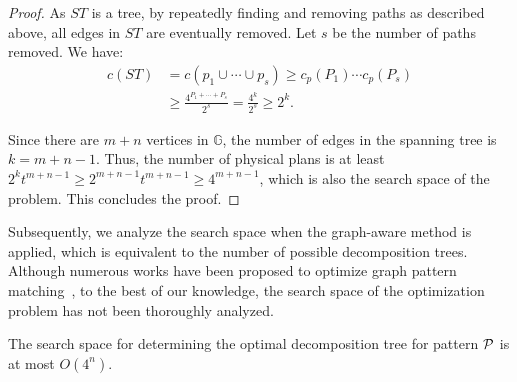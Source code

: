 \begin{proof}
    As $ST$ is a tree, by repeatedly finding and removing paths as described above, all edges in $ST$ are eventually removed. Let $s$ be the number of paths removed. We have:
    \begin{equation*}
    \begin{split}
        c(ST) & = c(p_1 \cup \cdots \cup p_s) \geq c_p(P_1) \cdots c_p(P_s) \\
        & \geq \frac{4^{P_1 + \cdots + P_s}}{2^s} = \frac{4^{k}}{2^s} \geq 2^{k}.
    \end{split}
    \end{equation*}

    Since there are $m + n$ vertices in $\mathbb{G}$, the number of edges in the spanning tree is $k = m + n - 1$. Thus, the number of physical plans is at least $2^{k}t^{m+n-1} \geq 2^{m+n-1}t^{m+n-1} \geq 4^{m+n-1}$, which is also the search space of the problem. This concludes the proof.
\end{proof}


Subsequently, we analyze the search space when the graph-aware method is applied, which is equivalent to the number of possible decomposition trees. Although numerous works have been proposed to optimize graph pattern matching~\cite{huge,GLogS,mhedhbi2019optimizing}, to the best of our knowledge, the search space of the optimization problem has not been thoroughly analyzed.

\begin{lemma} \label{lem:complexity-of-graph-aware}
The search space for determining the optimal decomposition tree for pattern $\mathcal{P}$ is at most $O(4^n)$.
\end{lemma}

